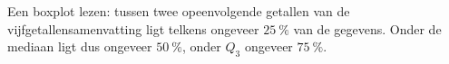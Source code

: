 \begin{werkwijze}
Een boxplot lezen: tussen twee opeenvolgende getallen van de vijfgetallensamenvatting ligt telkens ongeveer $25~\%$ van de gegevens. Onder de mediaan ligt dus ongeveer $50~\%$, onder $Q_3$ ongeveer $75~\%$.
\end{werkwijze}

\begin{oefeningen}
\end{oefeningen}

\opdrachtenkop

\begin{oefeningen}





















\end{oefeningen}


\begin{oefeningen}






\end{oefeningen}

